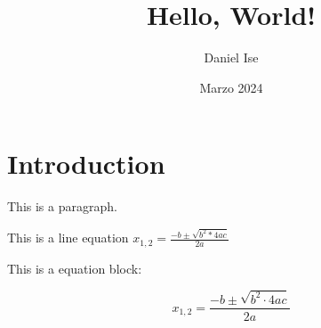 \documentclass{article}
\title{Hello, World!}
\author{Daniel Ise}
\date{Marzo 2024}
\begin{document}
\maketitle
\section{Introduction}

This is a paragraph. 

This is a line equation $x_{1,2}=\frac{-b \pm \sqrt{b^{2}*4ac}}{2a}$

This is a equation block:

\begin{equation}
	x_{1,2}=\frac{-b \pm \sqrt{b^{2} \cdot 4ac}}{2a}
	\label{eq: Resolvente}
\end{equation}
\end{document}

